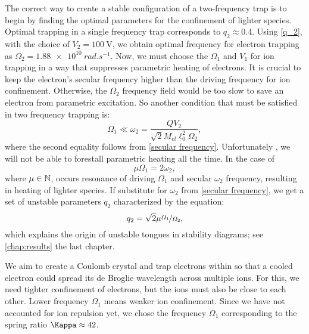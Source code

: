 The correct way to create a stable configuration of a two-frequency trap is to begin by finding the optimal parameters for the confinement of lighter species. Optimal trapping in a single frequency trap corresponds to \cite{gerlich1992inhomogeneous} $q_2 \approx 0.4$. Using \eqref{q_2}, with the choice of $V_2 = \SI{100}{\volt}$, we obtain optimal frequency for electron trapping as $\Omega_2 = \SI{1.88e10}{rad.s^{-1}}$. Now, we must choose the $\Omega_1$ and $V_1$ for ion trapping in a way that suppresses parametric heating of electrons. It is crucial to keep the electron's secular frequency higher than the driving frequency for ion confinement. Otherwise, the $\Omega_2$ frequency field would be too slow to save an electron from parametric excitation. So another condition that must be satisfied in two frequency trapping is:
\begin{equation}
	\label{frequency inequality}
	\Omega_1 \ll \omega_2 = \dfrac{Q V_2}{\sqrt{2} M_{el} \ell_0^2 \Omega_2},
\end{equation}
where the second equality follows from \eqref{secular frequency}. Unfortunately \cite{FOOT2018117}, we will not be able to forestall parametric heating all the time. In the case of $$\mu \Omega_1 = 2 \omega_2,$$
where $\mu \in \mathbb{N}$, occurs resonance of driving $\Omega_1$ and secular $\omega_2$ frequency, resulting in heating of lighter species. If substitute for $\omega_2$ from \eqref{secular frequency}, we get a set of unstable parameters $q_2$ characterized by the equation:
\begin{equation}
	\label{unstable q_2}
	q_2 = \sqrt{2}\mu\nicefrac{\Omega_1}{\Omega_2},
\end{equation}
which explains the origin of unstable tongues in stability diagrams; see \ref{chap:results} the last chapter.

We aim to create a Coulomb crystal and trap electrons within so that a cooled electron could spread its de Broglie wavelength across multiple ions. For this, we need tighter confinement of electrons, but the ions must also be close to each other. Lower frequency $\Omega_1$ means weaker ion confinement. Since we have not accounted for ion repulsion yet, we chose the frequency $\Omega_1$ corresponding to the spring ratio $\Kappa \approx 42$.

